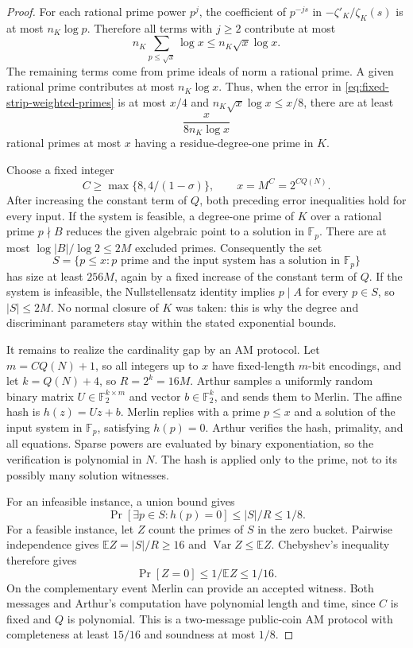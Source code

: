 \documentclass[11pt]{article}
\theoremstyle{definition}
\theoremstyle{remark}
\begin{document}
\begin{proof}
For each rational prime power $p^j$, the coefficient of
$p^{-js}$ in $-\zeta'_K/\zeta_K(s)$ is at most
$n_K\log p$.  Therefore all terms with $j\ge2$ contribute
at most
\[
 n_K\sum_{p\le\sqrt x}\log x
 \le n_K\sqrt x\log x.
\]
The remaining terms come from prime ideals of norm a
rational prime.  A given rational prime contributes at
most $n_K\log x$.  Thus, when the error in
\eqref{eq:fixed-strip-weighted-primes} is at most $x/4$
and $n_K\sqrt x\log x\le x/8$, there are at least
\[
 \frac{x}{8n_K\log x}
\]
rational primes at most $x$ having a residue-degree-one
prime in $K$.

Choose a fixed integer
\[
 C\ge\max\{8,4/(1-\sigma)\},\qquad
 x=M^C=2^{C Q(N)}.
\]
After increasing the constant term of $Q$, both preceding
error inequalities hold for every input.  If the system
is feasible, a degree-one prime of $K$ over a rational
prime $p\nmid B$ reduces the given algebraic point to a
solution in $\mathbb F_p$.  There are at most
$\log|B|/\log2\le2M$ excluded primes.  Consequently
the set
\[
 S=\{p\le x:p\text{ prime and the input system has
                         a solution in }\mathbb F_p\}
\]
has size at least $256M$, again by a fixed increase of
the constant term of $Q$.  If the system is infeasible,
the Nullstellensatz identity implies $p\mid A$ for
every $p\in S$, so $|S|\le2M$.
No normal closure of $K$ was taken: this is why the
degree and discriminant parameters stay within the
stated exponential bounds.

It remains to realize the cardinality gap by an AM
protocol.  Let $m=CQ(N)+1$, so all integers up to $x$
have fixed-length $m$-bit encodings, and let
$k=Q(N)+4$, so $R=2^k=16M$.
Arthur samples a uniformly random binary matrix
$U\in\mathbb F_2^{k\times m}$ and vector
$b\in\mathbb F_2^k$, and sends them to Merlin.
The affine hash is $h(z)=Uz+b$.
Merlin replies with a prime $p\le x$ and a solution
of the input system in $\mathbb F_p$, satisfying
$h(p)=0$.  Arthur verifies the hash, primality, and all
equations.  Sparse powers are evaluated by binary
exponentiation, so the verification is polynomial in $N$.
The hash is applied only to the prime, not to its possibly
many solution witnesses.

For an infeasible instance, a union bound gives
\[
 \Pr[\exists p\in S:h(p)=0]
 \le |S|/R\le1/8.
\]
For a feasible instance, let $Z$ count the primes of $S$
in the zero bucket.  Pairwise independence gives
$\mathbb EZ=|S|/R\ge16$ and
$\operatorname{Var}Z\le\mathbb EZ$.  Chebyshev's
inequality therefore gives
\[
 \Pr[Z=0]\le1/\mathbb EZ\le1/16.
\]
On the complementary event Merlin can provide an accepted
witness.  Both messages and Arthur's computation have
polynomial length and time, since $C$ is fixed and $Q$
is polynomial.  This is a two-message public-coin AM
protocol with completeness at least $15/16$ and
soundness at most $1/8$.
\end{proof}
\end{document}

